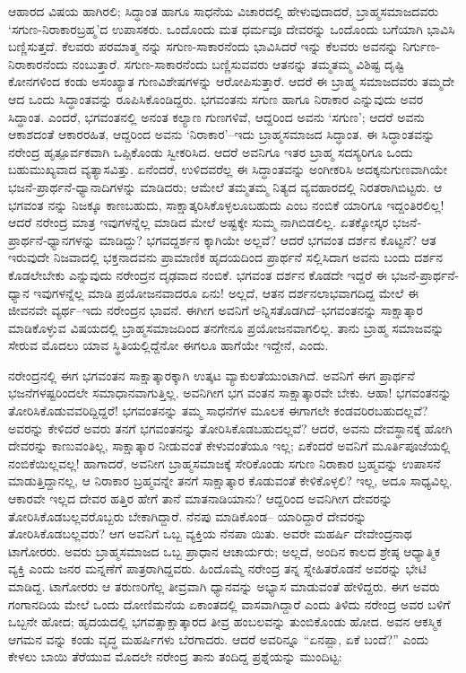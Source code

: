 ಆಹಾರದ ವಿಷಯ ಹಾಗಿರಲಿ; ಸಿದ್ಧಾಂತ ಹಾಗೂ ಸಾಧನೆಯ ವಿಚಾರದಲ್ಲಿ ಹೇಳುವುದಾದರೆ, ಬ್ರಾಹ್ಮಸಮಾಜದವರು ‘ಸಗುಣ-ನಿರಾಕಾರಬ್ರಹ್ಮ’ದ ಉಪಾಸಕರು. ಒಂದೊಂದು ಮತ ಧರ್ಮವೂ ದೇವರನ್ನು ಒಂದೊಂದು ಬಗೆಯಾಗಿ ಭಾವಿಸಿ ಬಣ್ಣಿಸುತ್ತದೆ. ಕೆಲವರು ಪರಮಾತ್ಮ ನನ್ನು ಸಗುಣ-ಸಾಕಾರನೆಂದು ಭಾವಿಸಿದರೆ ಇನ್ನು ಕೆಲವರು ಅವನನ್ನು ನಿರ್ಗುಣ-ನಿರಾಕಾರನೆಂದು ನಂಬುತ್ತಾರೆ. ಸಗುಣ-ಸಾಕಾರನೆಂದು ಬಣ್ಣಿಸುವವರು ಆತನನ್ನು ತಮ್ಮತಮ್ಮ ವಿಶಿಷ್ಟ ದೃಷ್ಟಿ ಕೋನಗಳಿಂದ ಕಂಡು ಅಸಂಖ್ಯಾತ ಗುಣವಿಶೇಷಗಳನ್ನು ಆರೋಪಿಸುತ್ತಾರೆ. ಆದರೆ ಈ ಬ್ರಾಹ್ಮ ಸಮಾಜದವರು ತಮ್ಮದೇ ಆದ ಒಂದು ಸಿದ್ಧಾಂತವನ್ನು ರೂಪಿಸಿಕೊಂಡಿದ್ದರು. ಭಗವಂತನು ಸಗುಣ ಹಾಗೂ ನಿರಾಕಾರ ಎನ್ನುವುದು ಅವರ ಸಿದ್ಧಾಂತ. ಎಂದರೆ, ಭಗವಂತನಲ್ಲಿ ಅನಂತ ಕಲ್ಯಾಣ ಗುಣಗಳಿವೆ, ಆದ್ದರಿಂದ ಅವನು ‘ಸಗುಣ’; ಆದರೆ ಅವನು ಆಕಾಶದಂತೆ ಆಕಾರರಹಿತ, ಆದ್ದರಿಂದ ಅವನು ‘ನಿರಾಕಾರ’–ಇದು ಬ್ರಾಹ್ಮಸಮಾಜದ ಸಿದ್ಧಾಂತ. ಈ ಸಿದ್ಧಾಂತವನ್ನು ನರೇಂದ್ರ ಹೃತ್ಪೂರ್ವಕವಾಗಿ ಒಪ್ಪಿಕೊಂಡು ಸ್ವೀಕರಿಸಿದ. ಆದರೆ ಅವನಿಗೂ ಇತರ ಬ್ರಾಹ್ಮ ಸದಸ್ಯರಿಗೂ ಒಂದು ಬಹುಮುಖ್ಯವಾದ ವ್ಯತ್ಯಾಸವಿತ್ತು. ಏನೆಂದರೆ, ಉಳಿದವರೆಲ್ಲ ಈ ಸಿದ್ಧಾಂತವನ್ನು ಅಂಗೀಕರಿಸಿ ಅದಕ್ಕನುಗುಣವಾಗಿಯೇ ಭಜನೆ-ಪ್ರಾರ್ಥನೆ-ಧ್ಯಾನಾದಿಗಳನ್ನು ಮಾಡಿದರು; ಆಮೇಲೆ ತಮ್ಮತಮ್ಮ ನಿತ್ಯದ ವ್ಯವಹಾರದಲ್ಲಿ ನಿರತರಾಗಿಬಿಟ್ಟರು. ಆ ಭಗವಂತ ನನ್ನು ನಿಜಕ್ಕೂ ಕಾಣಬಹುದು, ಸಾಕ್ಷಾತ್ಕರಿಸಿಕೊಳ್ಳಲೂಬಹುದು ಎಂಬ ನಂಬಿಕೆ ಯಾರಿಗೂ ಇದ್ದಂತಿರಲಿಲ್ಲ! ಆದರೆ ನರೇಂದ್ರ ಮಾತ್ರ ಇವುಗಳನ್ನೆಲ್ಲ ಮಾಡಿದ ಮೇಲೆ ಅಷ್ಟಕ್ಕೇ ಸುಮ್ಮ ನಾಗಿಬಿಡಲಿಲ್ಲ. ಏತಕ್ಕೋಸ್ಕರ ಭಜನೆ-ಪ್ರಾರ್ಥನೆ-ಧ್ಯಾನಗಳನ್ನು ಮಾಡಿದ್ದು? ಭಗವದ್ದರ್ಶನ ಕ್ಕಾಗಿಯೇ ಅಲ್ಲವೆ? ಆದರೆ ಭಗವಂತ ದರ್ಶನ ಕೊಟ್ಟನೆ? ಆತ ಇರುವುದೇ ನಿಜವಾದಲ್ಲಿ ಭಕ್ತನಾದವನು ಪ್ರಾಮಾಣಿಕ ಹೃದಯದಿಂದ ಪ್ರಾರ್ಥನೆ ಸಲ್ಲಿಸಿದಾಗ ಅವನು ಬಂದು ದರ್ಶನ ಕೊಡಲೇಬೇಕು ಎನ್ನುವುದು ನರೇಂದ್ರನ ದೃಢವಾದ ನಂಬಿಕೆ. ಭಗವಂತ ದರ್ಶನ ಕೊಡದೇ ಇದ್ದರೆ ಈ ಭಜನೆ-ಪ್ರಾರ್ಥನೆ-ಧ್ಯಾನ ಇವುಗಳನ್ನೆಲ್ಲ ಮಾಡಿ ಪ್ರಯೋಜನವಾದರೂ ಏನು! ಅಲ್ಲದೆ, ಆತನ ದರ್ಶನಲಾಭವಾಗದಿದ್ದ ಮೇಲೆ ಈ ಜೀವನವೇ ವ್ಯರ್ಥ–ಇದು ನರೇಂದ್ರನ ಭಾವನೆ. ಈಗೀಗ ಅವನಿಗೆ ಅನ್ನಿಸತೊಡಗಿದೆ–ಭಗವಂತನನ್ನು ಸಾಕ್ಷಾತ್ಕಾರ ಮಾಡಿಕೊಳ್ಳುವ ವಿಷಯದಲ್ಲಿ ಬ್ರಾಹ್ಮಸಮಾಜದಿಂದ ತನಗೇನೂ ಪ್ರಯೋಜನವಾಗಲಿಲ್ಲ. ತಾನು ಬ್ರಾಹ್ಮ ಸಮಾಜವನ್ನು ಸೇರುವ ಮೊದಲು ಯಾವ ಸ್ಥಿತಿಯಲ್ಲಿದ್ದೆನೋ ಈಗಲೂ ಹಾಗೆಯೇ ಇದ್ದೇನೆ, ಎಂದು.

ನರೇಂದ್ರನಲ್ಲಿ ಈಗ ಭಗವಂತನ ಸಾಕ್ಷಾತ್ಕಾರಕ್ಕಾಗಿ ಉತ್ಕಟ ವ್ಯಾಕುಲತೆಯುಂಟಾಗಿದೆ. ಅವನಿಗೆ ಈಗ ಪ್ರಾರ್ಥನೆ ಭಜನೆಗಳಷ್ಟರಿಂದಲೇ ಸಮಾಧಾನವಾಗುತ್ತಿಲ್ಲ. ಅವನಿಗೀಗ ಭಗ ವಂತನ ಸಾಕ್ಷಾತ್ಕಾರವೇ ಬೇಕು. ಆಹಾ! ಭಗವಂತನನ್ನು ತೋರಿಸಿಕೊಡುವವರಿದ್ದಿದ್ದರೆ! ಭಗವಂತನನ್ನು ತಮ್ಮ ಸಾಧನೆಗಳ ಮೂಲಕ ಈಗಾಗಲೇ ಕಂಡವರಿರಬಹುದಲ್ಲವೆ? ಅವರನ್ನು ಕೇಳಿದರೆ ಅವರು ತನಗೆ ಭಗವಂತನನ್ನು ತೋರಿಸಿಕೊಡಬಹುದಲ್ಲವೆ? ಆದರೆ, ಅವನು ದೇವಸ್ಥಾನಕ್ಕೆ ಹೋಗಿ ದೇವರನ್ನು ಕಾಣುವಂತಿಲ್ಲ, ಸಾಕ್ಷಾತ್ಕಾರ ನೀಡುವಂತೆ ಕೇಳುವಂತೆಯೂ ಇಲ್ಲ; ಏಕೆಂದರೆ ಅವನಿಗೆ ಮೂರ್ತಿಪೂಜೆಯಲ್ಲಿ ನಂಬಿಕೆಯಿಲ್ಲವಲ್ಲ! ಹಾಗಾದರೆ, ಅವನೀಗ ಬ್ರಾಹ್ಮಸಮಾಜಕ್ಕೆ ಸೇರಿಕೊಂಡು ಸಗುಣ ನಿರಾಕಾರ ಬ್ರಹ್ಮವನ್ನು ಉಪಾಸನೆ ಮಾಡುತ್ತಿದ್ದಾನಲ್ಲ, ಆ ನಿರಾಕಾರ ಬ್ರಹ್ಮವನ್ನೇ ತನಗೆ ಸಾಕ್ಷಾತ್ಕಾರ ಕೊಡುವಂತೆ ಕೇಳಿಕೊಳ್ಳಲಿ? ಇಲ್ಲ, ಅದೂ ಸಾಧ್ಯವಿಲ್ಲ. ಆಕಾರವೇ ಇಲ್ಲದ ದೇವರ ಹತ್ತಿರ ಹೇಗೆ ತಾನೆ ಮಾತನಾಡಿಯಾನು? ಆದ್ದರಿಂದ ಅವನಿಗೀಗ ದೇವರನ್ನು ತೋರಿಸಿಕೊಡಬಲ್ಲವರೊಬ್ಬರು ಬೇಕಾಗಿದ್ದಾರೆ. ನೆನಪು ಮಾಡಿಕೊಂಡ– ಯಾರಿದ್ದಾರೆ ದೇವರನ್ನು ತೋರಿಸಿಕೊಡಬಲ್ಲವರು? ಆಗ ಅವನಿಗೆ ಒಬ್ಬ ವ್ಯಕ್ತಿಯ ನೆನಪಾ ಯಿತು. ಅವರೇ ಮಹರ್ಷಿ ದೇವೇಂದ್ರನಾಥ ಟಾಗೋರರು. ಅವರು ಬ್ರಾಹ್ಮಸಮಾಜದ ಒಬ್ಬ ಪ್ರಾಧಾನ ಆಚಾರ್ಯರು; ಅಲ್ಲದೆ, ಅಂದಿನ ಕಾಲದ ಶ್ರೇಷ್ಠ ಆಧ್ಯಾತ್ಮಿಕ ವ್ಯಕ್ತಿ ಎಂದು ಜನರ ಮನ್ನಣೆಗೆ ಪಾತ್ರರಾಗಿದ್ದವರು. ಹಿಂದೊಮ್ಮೆ ನರೇಂದ್ರ ತನ್ನ ಸ್ನೇಹಿತರೊಡನೆ ಅವರನ್ನು ಭೇಟಿ ಮಾಡಿದ್ದ. ಟಾಗೋರರು ಆ ತರುಣರಿಗೆಲ್ಲ ತೀವ್ರವಾಗಿ ಧ್ಯಾನವನ್ನು ಅಭ್ಯಾಸ ಮಾಡುವಂತೆ ಹೇಳಿದ್ದರು. ಈಗ ಅವರು ಗಂಗಾನದಿಯ ಮೇಲೆ ಒಂದು ದೋಣಿಮನೆಯ ಏಕಾಂತದಲ್ಲಿ ವಾಸವಾಗಿದ್ದಾರೆ ಎಂದು ತಿಳಿದು ನರೇಂದ್ರ ಅವರ ಬಳಿಗೆ ಒಬ್ಬನೇ ಹೋದ; ಹೃದಯದಲ್ಲಿ ಭಗವತ್ಸಾಕ್ಷಾತ್ಕಾರದ ತೀವ್ರ ಹಂಬಲವನ್ನು ತುಂಬಿಕೊಂಡು ಹೋದ. ಅವನ ಆಕಸ್ಮಿಕ ಆಗಮನ ವನ್ನು ಕಂಡು ವೃದ್ಧ ಮಹರ್ಷಿಗಳು ಬೆರಗಾದರು. ಆದರೆ ಅವರಿನ್ನೂ “ಏನಪ್ಪಾ, ಏಕೆ ಬಂದೆ?” ಎಂದು ಕೇಳಲು ಬಾಯಿ ತೆರೆಯುವ ಮೊದಲೇ ನರೇಂದ್ರ ತಾನು ತಂದಿದ್ದ ಪ್ರಶ್ನೆಯನ್ನು ಮುಂದಿಟ್ಟ:


